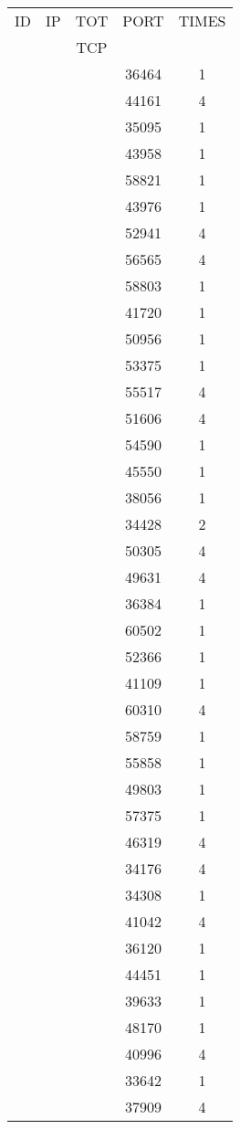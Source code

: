 \documentclass[a4paper]{scrartcl}
\begin{document}
\begin{minipage}[b]{0.5\linewidth}
\begin{tabular}{| c | c | c | c | c |}
\hline
ID & IP & TOT & PORT & TIMES \\ 
   &    & TCP &      &       \\ 
\hline
& & & 36464 & 1 \\ & & & 44161 & 4 \\ & & & 35095 & 1 \\ & & & 43958 & 1 \\ & & & 58821 & 1 \\ & & & 43976 & 1 \\ & & & 52941 & 4 \\ & & & 56565 & 4 \\ & & & 58803 & 1 \\ & & & 41720 & 1 \\ & & & 50956 & 1 \\ & & & 53375 & 1 \\ & & & 55517 & 4 \\ & & & 51606 & 4 \\ & & & 54590 & 1 \\ & & & 45550 & 1 \\ & & & 38056 & 1 \\ & & & 34428 & 2 \\ & & & 50305 & 4 \\ & & & 49631 & 4 \\ & & & 36384 & 1 \\ & & & 60502 & 1 \\ & & & 52366 & 1 \\ & & & 41109 & 1 \\ & & & 60310 & 4 \\ & & & 58759 & 1 \\ & & & 55858 & 1 \\ & & & 49803 & 1 \\ & & & 57375 & 1 \\ & & & 46319 & 4 \\ & & & 34176 & 4 \\ & & & 34308 & 1 \\ & & & 41042 & 4 \\ & & & 36120 & 1 \\ & & & 44451 & 1 \\ & & & 39633 & 1 \\ & & & 48170 & 1 \\ & & & 40996 & 4 \\ & & & 33642 & 1 \\ & & & 37909 & 4 \\ \hline\end{tabular}\end{minipage} \hfill\begin{minipage}[b]{0.5\linewidth}\begin{tabular}{| c | c | c | c | c |}

\end{tabular}
\end{minipage}
\end{document}
